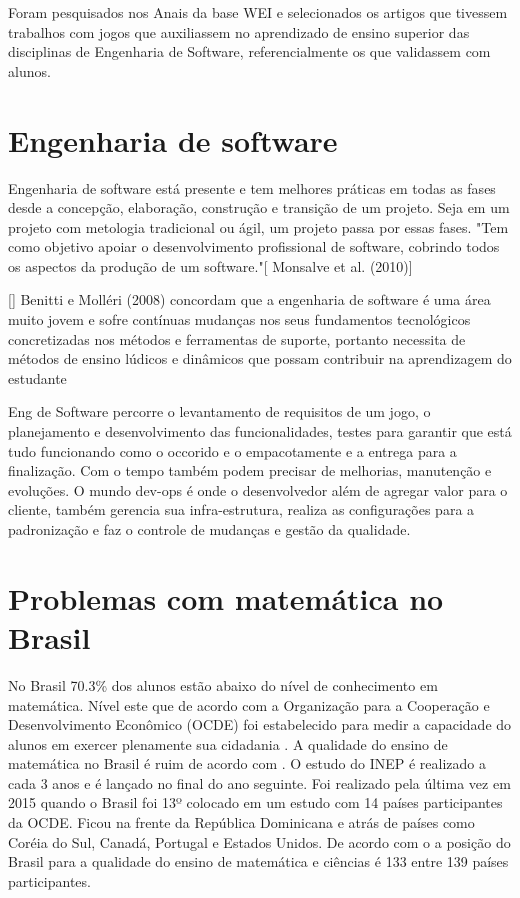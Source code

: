\begin{citacao}
Foram pesquisados nos Anais da base WEI e selecionados os artigos que tivessem trabalhos com jogos que auxiliassem no aprendizado de ensino superior das disciplinas de Engenharia de Software, referencialmente os que validassem com alunos. \cite{sucessoJogoEngSoft}
\end{citacao}


\section[Engenharia de software]{Engenharia de software}
Engenharia de software está presente e tem melhores práticas em todas as fases desde a concepção, elaboração, construção e transição de um projeto. Seja em um projeto com metologia tradicional ou ágil, um projeto passa por essas fases.
"Tem como objetivo apoiar o desenvolvimento profissional de software, cobrindo todos os aspectos da produção de um software."[\cite{sucessoJogoEngSoft}  Monsalve et al. (2010)]

[\cite{sucessoJogoEngSoft}] Benitti e Molléri (2008) concordam que a engenharia de software é uma área muito jovem e sofre contínuas mudanças nos seus fundamentos tecnológicos concretizadas nos métodos e ferramentas de suporte, portanto necessita de métodos de ensino lúdicos e dinâmicos que possam contribuir na aprendizagem do estudante



Eng de Software percorre o levantamento de requisitos de um jogo, o planejamento e desenvolvimento das funcionalidades, testes para garantir que está tudo funcionando como o occorido e o empacotamente e a entrega para a finalização. Com o tempo também podem precisar de melhorias, manutenção e evoluções. O mundo dev-ops é onde o desenvolvedor além de agregar valor para o cliente, também gerencia sua infra-estrutura, realiza as configurações para a padronização e faz o controle de mudanças e gestão da qualidade.




\section[Problemas com matemática no Brasil]{Problemas com matemática no Brasil}
No Brasil 70.3\% dos alunos estão abaixo do nível de conhecimento em matemática. Nível este que de acordo com a Organização para a Cooperação e Desenvolvimento Econômico (OCDE) foi estabelecido para medir a capacidade do alunos em exercer plenamente sua cidadania \cite{inep2015nivelcidadania}. A qualidade do ensino de matemática no Brasil é ruim de acordo com \cite{indiceRuimMat} \cite{inep2015}. O estudo do INEP é realizado a cada 3 anos e é lançado no final do ano seguinte. Foi realizado pela última vez em 2015 quando o Brasil foi 13º colocado em um estudo com 14 países participantes da OCDE. Ficou na frente da República Dominicana e atrás de países como Coréia do Sul, Canadá, Portugal e Estados Unidos. De acordo com o \cite{indiceRuimMat} a posição do Brasil para a qualidade do ensino de matemática e ciências é 133 entre 139 países participantes.

